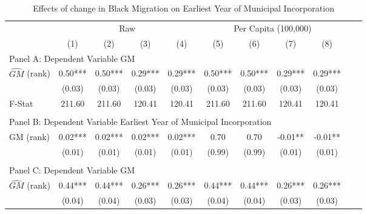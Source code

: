  \begin{table}[htbp]\centering {} \begin{threeparttable} \caption{Effects of change in Black Migration on Earliest Year of Municipal Incorporation} \begin{tabular}{l*{10}{c}} \toprule
                &\multicolumn{4}{c}{Raw}                                    &\multicolumn{4}{c}{Per Capita (100,000)}                   \\\cmidrule(lr){2-5}\cmidrule(lr){6-9}
                &\multicolumn{1}{c}{(1)}   &\multicolumn{1}{c}{(2)}   &\multicolumn{1}{c}{(3)}   &\multicolumn{1}{c}{(4)}   &\multicolumn{1}{c}{(5)}   &\multicolumn{1}{c}{(6)}   &\multicolumn{1}{c}{(7)}   &\multicolumn{1}{c}{(8)}   \\
\cmidrule(lr){1-9}
\multicolumn{8}{l}{Panel A: Dependent Variable GM}\\
\cmidrule(lr){1-9}
$\hat{GM}$ (rank)&       0.50***&       0.50***&       0.29***&       0.29***&       0.50***&       0.50***&       0.29***&       0.29***\\
                &     (0.03)   &     (0.03)   &     (0.03)   &     (0.03)   &     (0.03)   &     (0.03)   &     (0.03)   &     (0.03)   \\
\midrule
F-Stat          &     211.60   &     211.60   &     120.41   &     120.41   &     211.60   &     211.60   &     120.41   &     120.41   \\
\cmidrule[\heavyrulewidth](lr){1-9} \\ \cmidrule[\heavyrulewidth](lr){1-9}
\multicolumn{8}{l}{Panel B: Dependent Variable Earliest Year of Municipal Incorporation}\\
\cmidrule(lr){1-9}
GM  (rank)      &       0.02***&       0.02***&       0.02***&       0.02***&       0.70   &       0.70   &      -0.01** &      -0.01** \\
                &     (0.01)   &     (0.01)   &     (0.01)   &     (0.01)   &     (0.99)   &     (0.99)   &     (0.01)   &     (0.01)   \\
\cmidrule[\heavyrulewidth](lr){1-9} \\ \cmidrule[\heavyrulewidth](lr){1-9}
\multicolumn{8}{l}{Panel C: Dependent Variable GM}\\
\cmidrule(lr){1-9}
$\hat{GM}$ (rank)&       0.44***&       0.44***&       0.26***&       0.26***&       0.44***&       0.44***&       0.26***&       0.26***\\
                &     (0.04)   &     (0.04)   &     (0.03)   &     (0.03)   &     (0.04)   &     (0.04)   &     (0.03)   &     (0.03)   \\

\end{tabular}
\end{threeparttable}
\end{table}

